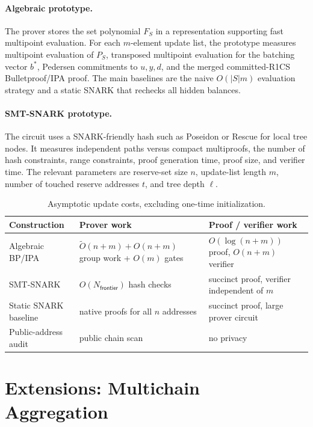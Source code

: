 \documentclass[runningheads]{llncs}
\newcommand{\softO}{\widetilde{O}}
\begin{document}
\paragraph{Algebraic prototype.}
The prover stores the set polynomial \(F_S\) in a representation supporting fast multipoint evaluation.  For each \(m\)-element update list, the prototype measures multipoint evaluation of \(P_S\), transposed multipoint evaluation for the batching vector \(b^*\), Pedersen commitments to \(u,y,d\), and the merged committed-R1CS Bulletproof/IPA proof.  The main baselines are the naive \(O(|S|m)\) evaluation strategy and a static SNARK that rechecks all hidden balances.

\paragraph{SMT-SNARK prototype.}
The circuit uses a SNARK-friendly hash such as Poseidon or Rescue for local tree nodes.  It measures independent paths versus compact multiproofs, the number of hash constraints, range constraints, proof generation time, proof size, and verifier time.  The relevant parameters are reserve-set size \(n\), update-list length \(m\), number of touched reserve addresses \(t\), and tree depth \(\ell\).

\begin{table}[t]
\centering
\caption{Asymptotic update costs, excluding one-time initialization.}
\label{tab:costs}
\begin{tabular}{lll}
\toprule
Construction & Prover work & Proof / verifier work \\
\midrule
Algebraic BP/IPA & \(\softO(n+m)+O(n+m)\) group work + \(O(m)\) gates & \(O(\log(n+m))\) proof, \(O(n+m)\) verifier \\
SMT-SNARK & \(O(N_{\mathsf{frontier}})\) hash checks & succinct proof, verifier independent of \(m\) \\
Static SNARK baseline & native proofs for all \(n\) addresses & succinct proof, large prover circuit \\
Public-address audit & public chain scan & no privacy \\
\bottomrule
\end{tabular}
\end{table}

\section{Extensions: Multichain Aggregation}
\end{document}
